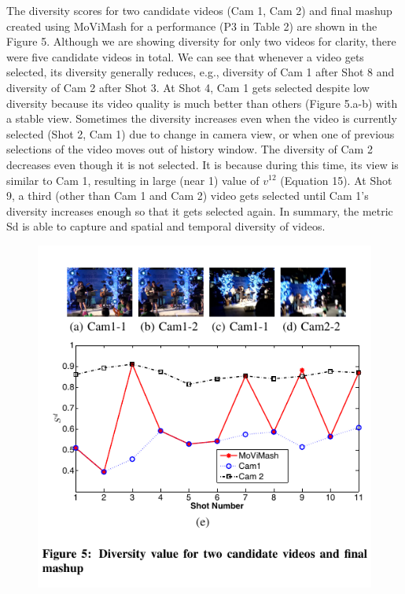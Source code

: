 \documentclass{sig-alternate}
\begin{document}
The diversity scores for two candidate videos (Cam 1, Cam 2)
and final mashup created using MoViMash for a performance (P3
in Table 2) are shown in the Figure 5. Although we are showing
diversity for only two videos for clarity, there were five candidate
videos in total. We can see that whenever a video gets selected,
its diversity generally reduces, e.g., diversity of Cam 1 after Shot 8
and diversity of Cam 2 after Shot 3. At Shot 4, Cam 1 gets selected
despite low diversity because its video quality is much better than
others (Figure 5.a-b) with a stable view. Sometimes the diversity
increases even when the video is currently selected (Shot 2, Cam 1)
due to change in camera view, or when one of previous selections
of the video moves out of history window. The diversity of Cam 2
decreases even though it is not selected. It is because during this
time, its view is similar to Cam 1, resulting in large (near 1) value
of $v^{12}$ (Equation 15). At Shot 9, a third (other than Cam 1 and Cam
2) video gets selected until Cam 1’s diversity increases enough so
that it gets selected again. In summary, the metric Sd is able to
capture and spatial and temporal diversity of videos.

\begin{figure}{
\includegraphics{image5.pdf}}
\end{figure}
\end{document}
